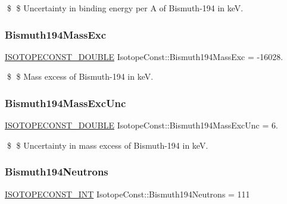 \$ \$ Uncertainty in binding energy per A of Bismuth-\/194 in keV. \mbox{\label{group___isotope_const-_bismuth-_bi194_gae26816a58102809a02ce1df555b26a5f}} 
\subsubsection{\texorpdfstring{Bismuth194\+Mass\+Exc}{Bismuth194MassExc}}
{\footnotesize\ttfamily \mbox{\hyperlink{group___isotope_const-_macros_ga8f45a7272ce02c0b4c65c44636ed719a}{I\+S\+O\+T\+O\+P\+E\+C\+O\+N\+S\+T\+\_\+\+D\+O\+U\+B\+LE}} Isotope\+Const\+::\+Bismuth194\+Mass\+Exc = -\/16028.}

\$ \$ Mass excess of Bismuth-\/194 in keV. \mbox{\label{group___isotope_const-_bismuth-_bi194_ga5c9c9eeaac6c0d5aa1840e0b27a3be35}} 
\subsubsection{\texorpdfstring{Bismuth194\+Mass\+Exc\+Unc}{Bismuth194MassExcUnc}}
{\footnotesize\ttfamily \mbox{\hyperlink{group___isotope_const-_macros_ga8f45a7272ce02c0b4c65c44636ed719a}{I\+S\+O\+T\+O\+P\+E\+C\+O\+N\+S\+T\+\_\+\+D\+O\+U\+B\+LE}} Isotope\+Const\+::\+Bismuth194\+Mass\+Exc\+Unc = 6.}

\$ \$ Uncertainty in mass excess of Bismuth-\/194 in keV. \mbox{\label{group___isotope_const-_bismuth-_bi194_gadcac48c30c6f179c73f19744dcbb2c31}} 
\subsubsection{\texorpdfstring{Bismuth194\+Neutrons}{Bismuth194Neutrons}}
{\footnotesize\ttfamily \mbox{\hyperlink{group___isotope_const-_macros_ga5f18360b3e99483a35c32d789e62621c}{I\+S\+O\+T\+O\+P\+E\+C\+O\+N\+S\+T\+\_\+\+I\+NT}} Isotope\+Const\+::\+Bismuth194\+Neutrons = 111}

